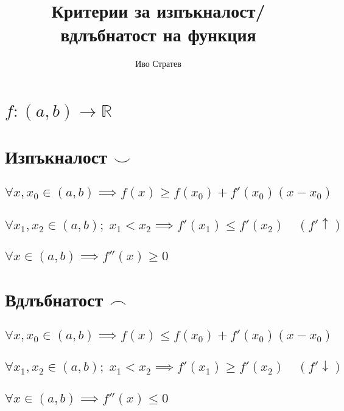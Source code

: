 \documentclass{article}
\title{Критерии за изпъкналост/вдлъбнатост на функция}
\author{Иво Стратев}
\begin{document}
    \maketitle
    \section{\(f: (a, b) \to \mathbb{R}\)}
    \section{Изпъкналост \(\smile\)}
    \subsection{\(\forall x, x_0 \in (a, b) \implies f(x) \geq f(x_0) + f'(x_0)(x - x_0)\)}
    \subsection{\(\forall x_1, x_2 \in (a, b); \; x_1 < x_2 \implies f'(x_1) \leq f'(x_2) \quad (f'\uparrow) \)}
    \subsection{\(\forall x \in (a, b) \implies f''(x) \geq 0\)}
    \section{Вдлъбнатост \(\frown\)}
    \subsection{\(\forall x, x_0 \in (a, b) \implies f(x) \leq f(x_0) + f'(x_0)(x - x_0)\)}
    \subsection{\(\forall x_1, x_2 \in (a, b); \; x_1 < x_2 \implies f'(x_1) \geq f'(x_2) \quad (f'\downarrow) \)}
    \subsection{\(\forall x \in (a, b) \implies f''(x) \leq 0\)}
\end{document}
